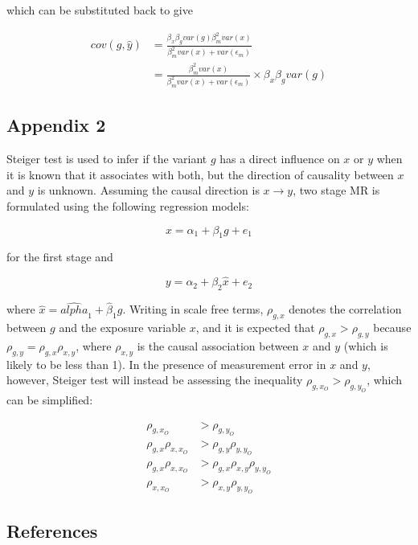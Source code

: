 \documentclass[]{article}
\begin{document}
which can be substituted back to give

\[
\begin{aligned}
cov(g, \hat{y}) & = \frac{\beta_x\beta_g var(g) \beta_m^2 var(x)} {\beta_m^2 var(x) + var(\epsilon_m)} \\
                & = \frac{\beta_m^2 var(x)} {\beta_m^2 var(x) + var(\epsilon_m)} \times \beta_x\beta_g var(g)
\end{aligned}
\]

\newpage

\subsection{Appendix 2}\label{appendix-2}

Steiger test is used to infer if the variant \(g\) has a direct
influence on \(x\) or \(y\) when it is known that it associates with
both, but the direction of causality between \(x\) and \(y\) is unknown.
Assuming the causal direction is \(x \to y\), two stage MR is formulated
using the following regression models:

\[
x = \alpha_1 + \beta_1 g + e_1
\]

for the first stage and

\[
y = \alpha_2 + \beta_2 \hat{x} + e_2
\]

where \(\hat{x} = \hat{alpha}_1 + \hat{\beta}_1 g\). Writing in scale
free terms, \(\rho_{g, x}\) denotes the correlation between \(g\) and
the exposure variable \(x\), and it is expected that
\(\rho_{g, x} > \rho_{g, y}\) because
\(\rho_{g, y} = \rho_{g, x}\rho_{x, y}\), where \(\rho_{x, y}\) is the
causal association between \(x\) and \(y\) (which is likely to be less
than 1). In the presence of measurement error in \(x\) and \(y\),
however, Steiger test will instead be assessing the inequality
\(\rho_{g, x_O} > \rho_{g, y_O}\), which can be simplified:

\[
\begin{aligned}
\rho_{g, x_O} & > \rho_{g, y_O} \\
\rho_{g, x} \rho_{x, x_O} & > \rho_{g,y}\rho_{y,y_O}\\
\rho_{g, x} \rho_{x, x_O} & > \rho_{g,x}\rho_{x,y}\rho_{y,y_O}\\
\rho_{x, x_O} & > \rho_{x,y}\rho_{y,y_O}
\end{aligned}
\]

\newpage

\subsection*{References}\label{references}
\end{document}

